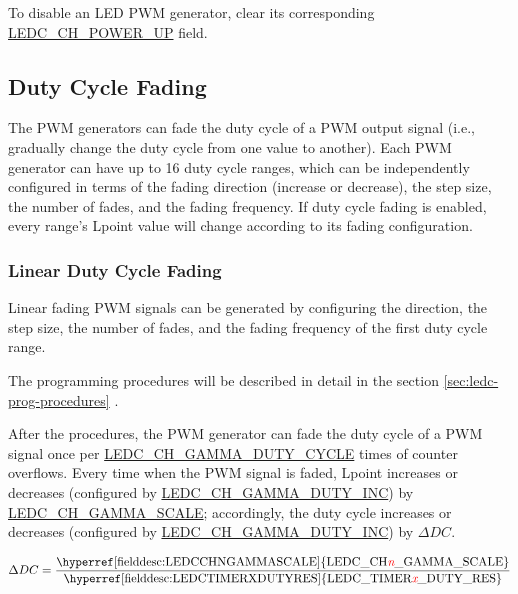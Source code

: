 \documentclass[main\_\_EN.tex]{subfiles}
\begin{document}
To disable an LED PWM generator, clear its corresponding \hyperref[fielddesc:LEDCCHNPOWERUP]{LEDC\_CH\_POWER\_UP} field.

\subsection{Duty Cycle Fading}

The PWM generators can fade the duty cycle of a PWM output signal (i.e., gradually change the duty cycle from one value to another). Each PWM generator can have up to 16 duty cycle ranges, which can be independently configured in terms of the fading direction (increase or decrease), the step size, the number of fades, and the fading frequency. If duty cycle fading is enabled, every range's Lpoint value will change according to its fading configuration.

\subsubsection{Linear Duty Cycle Fading}
\label{sec:ledc-pwm-linear-duty-cycle-fading}

Linear fading PWM signals can be generated by configuring the direction, the step size, the number of fades, and the fading frequency of the first duty cycle range.


The programming procedures will be described in detail in the section \ref{sec:ledc-prog-procedures} \textit{}.

After the procedures, the PWM generator can fade the duty cycle of a PWM signal once per \hyperref[fielddesc:LEDCCHNGAMMADUTYCYCLE]{LEDC\_CH\_GAMMA\_DUTY\_CYCLE} times of counter overflows. Every time when the PWM signal is faded, Lpoint increases or decreases (configured by \hyperref[fielddesc:LEDCCHNGAMMADUTYINC]{LEDC\_CH\_GAMMA\_DUTY\_INC}) by \hyperref[fielddesc:LEDCCHNGAMMASCALE]{LEDC\_CH\_GAMMA\_SCALE}; accordingly, the duty cycle increases or decreases (configured by \hyperref[fielddesc:LEDCCHNGAMMADUTYINC]{LEDC\_CH\_GAMMA\_DUTY\_INC}) by $\Delta DC$.

\begin{equation}
    \Delta DC = \frac{\textrm{\hyperref[fielddesc:LEDCCHNGAMMASCALE]{LEDC\_CH\regindex{n}\_GAMMA\_SCALE}}}{\textrm{\hyperref[fielddesc:LEDCTIMERXDUTYRES]{LEDC\_TIMER\regindex{x}\_DUTY\_RES}}}
\end{equation}
\end{document}
